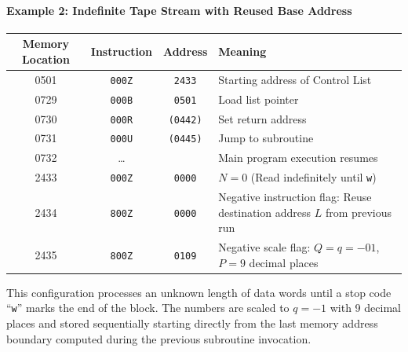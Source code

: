 \paragraph{Example 2: Indefinite Tape Stream with Reused Base Address}
\begin{table}[h!]
\centering
\begin{tabularx}{\textwidth}{cccX}
\toprule
\textbf{Memory Location} & \textbf{Instruction} & \textbf{Address} & \textbf{Meaning} \\
\midrule
    0501              & \texttt{000Z}   & \texttt{2433}    & Starting address of Control List \\
    0729              & \texttt{000B}   & \texttt{0501}    & Load list pointer \\
    0730              & \texttt{000R}   & \texttt{(0442)}  & Set return address \\
    0731              & \texttt{000U}   & \texttt{(0445)}  & Jump to subroutine \\
    0732              & \dots           &                  & Main program execution resumes \\
    \midrule
    2433              & \texttt{000Z}   & \texttt{0000}    & $N = 0$ (Read indefinitely until \texttt{w}) \\
    2434              & \texttt{800Z}   & \texttt{0000}    & Negative instruction flag: Reuse destination address $L$ from previous run \\
2435              & \texttt{800Z}   & \texttt{0109}    & Negative scale flag: $Q = q = -01$, $P = 9$ decimal places \\
\bottomrule
\end{tabularx}
\end{table}
This configuration processes an unknown length of data words until a stop code ``\texttt{w}'' marks the end of the block. The numbers are scaled to $q = -1$ with 9 decimal places and stored sequentially starting directly from the last memory address boundary computed during the previous subroutine invocation.

